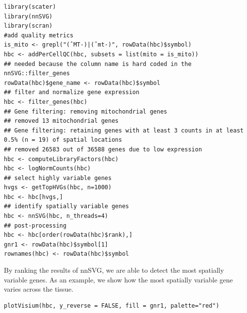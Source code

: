 \begin{shaded}
\begin{verbatim}
library(scater)
library(nnSVG)
library(scran)
#add quality metrics
is_mito <- grepl("(ˆMT-)|(ˆmt-)", rowData(hbc)$symbol)
hbc <- addPerCellQC(hbc, subsets = list(mito = is_mito))
## needed because the column name is hard coded in the nnSVG::filter_genes
rowData(hbc)$gene_name <- rowData(hbc)$symbol
## filter and normalize gene expression
hbc <- filter_genes(hbc)
## Gene filtering: removing mitochondrial genes
## removed 13 mitochondrial genes
## Gene filtering: retaining genes with at least 3 counts in at least 0.5% (n = 19) of spatial locations
## removed 26583 out of 36588 genes due to low expression
hbc <- computeLibraryFactors(hbc)
hbc <- logNormCounts(hbc)
## select highly variable genes
hvgs <- getTopHVGs(hbc, n=1000)
hbc <- hbc[hvgs,]
## identify spatially variable genes
hbc <- nnSVG(hbc, n_threads=4)
## post-processing
hbc <- hbc[order(rowData(hbc)$rank),]
gnr1 <- rowData(hbc)$symbol[1]
rownames(hbc) <- rowData(hbc)$symbol
\end{verbatim}
\end{shaded}

By ranking the results of nnSVG, we are able to detect the most spatially
variable genes. As an example, we show how the most spatially variable gene varies
across the tissue.


\begin{shaded}
\begin{verbatim}
plotVisium(hbc, y_reverse = FALSE, fill = gnr1, palette="red")
\end{verbatim}
\end{shaded}

